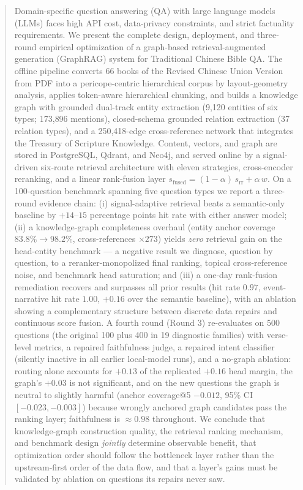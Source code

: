 \documentclass[journal]{IEEEtran}
\begin{document}
\begin{abstract}
Domain-specific question answering (QA) with large language models (LLMs)
faces high API cost, data-privacy constraints, and strict factuality
requirements. We present the complete design, deployment, and three-round
empirical optimization of a graph-based retrieval-augmented generation
(GraphRAG) system for Traditional Chinese Bible QA. The offline pipeline
converts 66 books of the Revised Chinese Union Version from PDF into a
pericope-centric hierarchical corpus by layout-geometry analysis, applies
token-aware hierarchical chunking, and builds a knowledge graph with
grounded dual-track entity extraction (9{,}120 entities of six types;
173{,}896 mentions), closed-schema grounded relation extraction (37
relation types), and a 250{,}418-edge cross-reference network that
integrates the Treasury of Scripture Knowledge. Content, vectors, and graph
are stored in PostgreSQL, Qdrant, and Neo4j, and served online by a
signal-driven six-route retrieval architecture with eleven strategies,
cross-encoder reranking, and a linear rank-fusion layer
$s_{\mathrm{fused}}=(1-\alpha)\,s_{\mathrm{rr}}+\alpha\,w$. On a
100-question benchmark spanning five question types we report a three-round
evidence chain: (i) signal-adaptive retrieval beats a semantic-only
baseline by $+14$--$15$ percentage points hit rate with either answer
model; (ii) a knowledge-graph completeness overhaul (entity anchor coverage
$83.8\%\!\rightarrow\!98.2\%$, cross-references $\times 273$) yields
\emph{zero} retrieval gain on the head-entity benchmark --- a negative
result we diagnose, question by question, to a reranker-monopolized final
ranking, topical cross-reference noise, and benchmark head saturation; and
(iii) a one-day rank-fusion remediation recovers and surpasses all prior
results (hit rate $0.97$, event-narrative hit rate $1.00$, $+0.16$ over the
semantic baseline), with an ablation showing a complementary structure
between discrete data repairs and continuous score fusion. A fourth
round (Round 3) re-evaluates on 500 questions (the original 100 plus 400
in 19 diagnostic families) with verse-level metrics, a repaired
faithfulness judge, a repaired intent classifier (silently inactive in
all earlier local-model runs), and a no-graph ablation: routing alone
accounts for $+0.13$ of the replicated $+0.16$ head margin, the graph's
$+0.03$ is not significant, and on the new questions the graph is
neutral to slightly harmful (anchor coverage@5 $-0.012$, 95\% CI
$[-0.023,-0.003]$) because wrongly anchored graph candidates pass the
ranking layer; faithfulness is $\approx 0.98$ throughout. We conclude
that knowledge-graph construction quality, the retrieval ranking
mechanism, and benchmark design \emph{jointly} determine observable
benefit, that optimization order should follow the bottleneck layer
rather than the upstream-first order of the data flow, and that a
layer's gains must be validated by ablation on questions its repairs
never saw.
\end{abstract}
\end{document}
